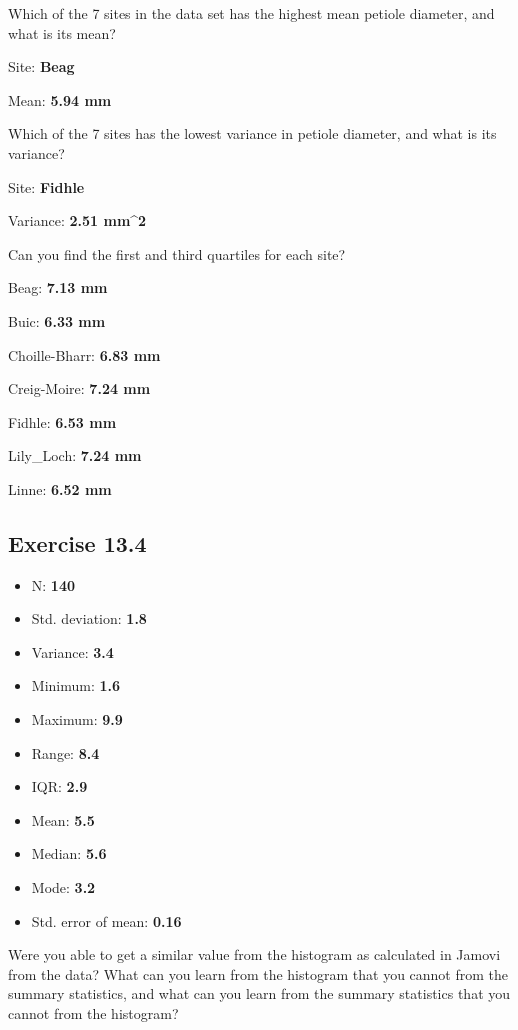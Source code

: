 \documentclass[
  openany]{scrbook}
\providecommand{\tightlist}{%
  \setlength{\itemsep}{0pt}\setlength{\parskip}{0pt}}
\begin{document}
Which of the 7 sites in the data set has the highest mean petiole diameter, and what is its
mean?

Site: \textbf{Beag}

Mean: \textbf{5.94 mm}

Which of the 7 sites has the lowest variance in petiole diameter, and what is its variance?

Site: \textbf{Fidhle}

Variance: \textbf{2.51 mm\^{}2}

Can you find the first and third quartiles for each site?

Beag: \textbf{7.13 mm}

Buic: \textbf{6.33 mm}

Choille-Bharr: \textbf{6.83 mm}

Creig-Moire: \textbf{7.24 mm}

Fidhle: \textbf{6.53 mm}

Lily\_Loch: \textbf{7.24 mm}

Linne: \textbf{6.52 mm}

\hypertarget{exercise-13.4}{%
\subsection{Exercise 13.4}\label{exercise-13.4}}

\begin{itemize}
\tightlist
\item
  N: \textbf{140}
\item
  Std. deviation: \textbf{1.8}
\item
  Variance: \textbf{3.4}
\item
  Minimum: \textbf{1.6}
\item
  Maximum: \textbf{9.9}
\item
  Range: \textbf{8.4}
\item
  IQR: \textbf{2.9}
\item
  Mean: \textbf{5.5}
\item
  Median: \textbf{5.6}
\item
  Mode: \textbf{3.2}
\item
  Std. error of mean: \textbf{0.16}
\end{itemize}

Were you able to get a similar value from the histogram as calculated in Jamovi from the data? What can you learn from the histogram that you cannot from the summary statistics, and what can you learn from the summary statistics that you cannot from the histogram?
\end{document}
